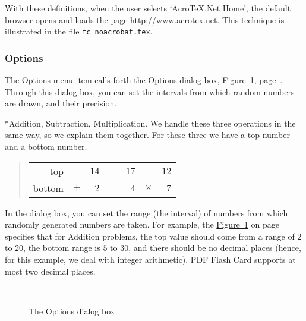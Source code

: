 \documentclass{article}
\makeatletter
\let\uif\textsf
\newcommand{\prodName}{\textsf{PDF Flash Card}}
\renewcommand{\paragraph}{\@startsection{paragraph}{4}{0pt}{6pt}{-3pt}{\bfseries}}
\makeatother
\begin{document}
With these definitions, when the user selects `\uif{AcroTeX.Net Home}', the
default browser opens and loads the page \url{http://www.acrotex.net}. This
technique is illustrated in the file \texttt{fc\_noacrobat.tex}.



\subsubsection{Options}\label{options}

The \uif{Options} menu item calls forth the
\uif{Options} dialog box,
\hyperref[menuOptions]{Figure~\ref*{menuOptions}},
page~\pageref*{menuOptions}. Through this dialog box, you can set the
intervals from which random numbers are drawn, and their precision.

\paragraph*{Addition, Subtraction, Multiplication.} We handle these three
operations in the same way, so we explain them together. For these three
we have a top number and a bottom number.
\begin{quote}%
\begin{tabular}{rc@{ }rc@{ }rc@{ }r}
top & & $14$ & & $17$ & & $12$ \\
bottom &$+$& $2$ &$-$& $4$ &$\times$& $7$ \\
\end{tabular}
\end{quote}
In the dialog box, you can set the range (the interval) of numbers from which
randomly generated numbers are taken. For example, the
\hyperref[menuOptions]{Figure~\ref*{menuOptions}} on
page~\pageref*{menuOptions} specifies that for \textsf{Addition} problems, the top
value should come from a range of $2$ to $20$, the bottom range is $5$ to
$30$, and there should be no decimal places (hence, for this example, we
deal with integer arithmetic). {\prodName} supports at most two decimal places.

\begin{figure}[htb]
\begin{center}\setlength{\fboxsep}{0pt}
\\
\caption{The \texorpdfstring{\protect\uif{Options}}{Options} dialog box}\label{menuOptions}
\end{center}
\end{figure}
\end{document}
